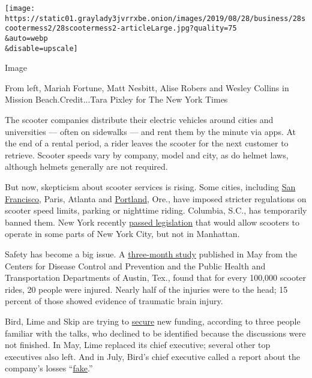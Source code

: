 \texttt{[image: https://static01.graylady3jvrrxbe.onion/images/2019/08/28/business/28scootermess2/28scootermess2-articleLarge.jpg?quality=75\\\&auto=webp\\\&disable=upscale]}

Image

From left, Mariah Fortune, Matt Nesbitt, Alise Robers and Wesley Collins
in Mission Beach.Credit...Tara Pixley for The New York Times

The scooter companies distribute their electric vehicles around cities
and universities --- often on sidewalks --- and rent them by the minute
via apps. At the end of a rental period, a rider leaves the scooter for
the next customer to retrieve. Scooter speeds vary by company, model and
city, as do helmet laws, although helmets generally are not required.

But now, skepticism about scooter services is rising. Some cities,
including
\href{https://www.nytimes3xbfgragh.onion/2018/08/30/technology/san-francisco-scooter-permits.html}{San
Francisco}, Paris, Atlanta and
\href{https://www.nytimes3xbfgragh.onion/2019/01/15/technology/electric-scooters-portland-oregon.html}{Portland},
Ore., have imposed stricter regulations on scooter speed limits, parking
or nighttime riding. Columbia, S.C., has temporarily banned them. New
York recently
\href{https://www.nytimes3xbfgragh.onion/2019/06/19/nyregion/scooters-nyc.html}{passed
legislation} that would allow scooters to operate in some parts of New
York City, but not in Manhattan.

Safety has become a big issue. A
\href{http://www.austintexas.gov/sites/default/files/files/Health/Web_Dockless_Electric_Scooter-Related_Injury_Study_final_version_EDSU_5.14.19.pdf}{three-month
study} published in May from the Centers for Disease Control and
Prevention and the Public Health and Transportation Departments of
Austin, Tex., found that for every 100,000 scooter rides, 20 people were
injured. Nearly half of the injuries were to the head; 15 percent of
those showed evidence of traumatic brain injury.

Bird, Lime and Skip are trying to
\href{https://www.nytimes3xbfgragh.onion/2019/07/22/technology/bird-scooters-valuation.html}{secure}
new funding, according to three people familiar with the talks, who
declined to be identified because the discussions were not finished. In
May, Lime replaced its chief executive; several other top executives
also left. And in July, Bird's chief executive called a report about the
company's losses
``\href{https://twitter.com/travisv/status/1149762439593861120}{fake}.''

